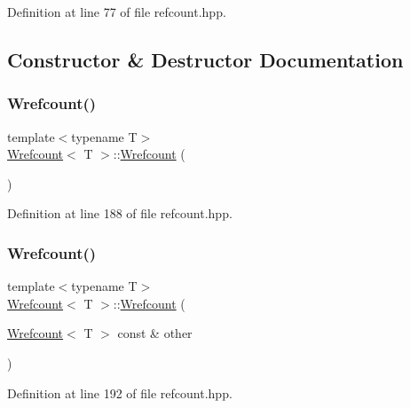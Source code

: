 Definition at line 77 of file refcount.\+hpp.



\subsection{Constructor \& Destructor Documentation}
\mbox{\label{classWrefcount_a153e40203502de14e21ce10f1e41b29d}} 
\subsubsection{\texorpdfstring{Wrefcount()}{Wrefcount()}\hspace{0.1cm}{\footnotesize\ttfamily [1/3]}}
{\footnotesize\ttfamily template$<$typename T$>$ \\
\hyperlink{classWrefcount}{Wrefcount}$<$ T $>$\+::\hyperlink{classWrefcount}{Wrefcount} (\begin{DoxyParamCaption}{ }\end{DoxyParamCaption})\hspace{0.3cm}{\ttfamily [inline]}}



Definition at line 188 of file refcount.\+hpp.

\mbox{\label{classWrefcount_af0dd24fad728dd9ee62c9d1bbe6a32fb}} 
\subsubsection{\texorpdfstring{Wrefcount()}{Wrefcount()}\hspace{0.1cm}{\footnotesize\ttfamily [2/3]}}
{\footnotesize\ttfamily template$<$typename T$>$ \\
\hyperlink{classWrefcount}{Wrefcount}$<$ T $>$\+::\hyperlink{classWrefcount}{Wrefcount} (\begin{DoxyParamCaption}\item[{\hyperlink{classWrefcount}{Wrefcount}$<$ T $>$ const \&}]{other }\end{DoxyParamCaption})\hspace{0.3cm}{\ttfamily [inline]}}



Definition at line 192 of file refcount.\+hpp.

